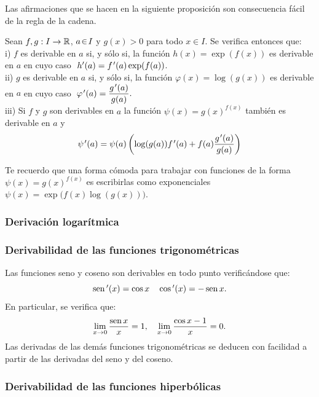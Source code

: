 Las afirmaciones que se hacen en la siguiente proposición son consecuencia
fácil de la regla de la cadena.

\begin{proposicion}{}{} Sean $f,g:I\rightarrow\mathbb R$, $a\!\in\! I$ y $g(x)>0$
para todo $x\in I$. Se verifica entonces que:\\
i) $f$ es derivable en $a$ si, y sólo si, la función $h(x)=\exp(f(x))$
es derivable en $a$ en cuyo caso $\ h^{\prime}(a)=f\tl(a)\exp(f(a))$.\\
ii) $g$ es derivable en $a$ si, y sólo si, la función $\varphi(x)=\log(g(x))$
es derivable en $a$ en cuyo caso ${\ {\displaystyle \varphi\mbox{$^{\mspace{2mu}\prime}$}(a)=\frac{g\mbox{$^{\mspace{2mu}\prime}$}(a)}{g(a)}.}}$\\
iii) Si $f$ y $g$ son derivables en $a$ la función $\psi(x)=g(x)^{f(x)}$
también es derivable en $a$ y 
\[
\psi\mbox{$^{\mspace{2mu}\prime}$}(a)=\psi(a)\left(\log(g(a))f\mbox{$^{\mspace{2mu}\prime}$}(a)+f(a)\frac{g\mbox{$^{\mspace{2mu}\prime}$}(a)}{g(a)}\right)
\]
\end{proposicion}

Te recuerdo que una forma cómoda para trabajar con funciones de la
forma $\psi(x)=g(x)^{f(x)}$ es escribirlas como exponenciales $\psi(x)=\exp\big(f(x)\log(g(x))\big)$.\vspace*{-3mm}


\subsubsection{Derivación logarítmica}

\subsubsection{Derivabilidad de las funciones trigonométricas}

Las funciones seno y coseno son derivables en todo punto verificándose
que: 
\[
\operatorname{sen}\mbox{$^{\prime}$}(x)=\cos x\quad\cos\mbox{$^{\prime}$}(x)=-\operatorname{sen} x.
\]
En particular, se verifica que: 
\[
\lim_{x\to0}\dfrac{\operatorname{sen} x}{x}=1,\quad\lim_{x\to0}\dfrac{\cos x-1}{x}=0.
\]
Las derivadas de las demás funciones trigonométricas se deducen con
facilidad a partir de las derivadas del seno y del coseno. \vspace*{-3mm}


\subsubsection{Derivabilidad de las funciones hiperbólicas}

